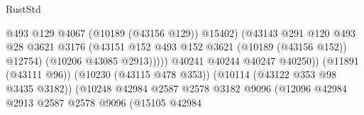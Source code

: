 \begin{lexlean}{RustStd}
\begin{coremodule}
                                                            @493
                                                            @129
                                                            @4067
                                                            (@10189 (@43156 @129))
                                                            @15402)
                                                          (@43143
                                                            @291
                                                            @120
                                                            @493
                                                            @28
                                                            @3621
                                                            @3176
                                                            (@43151
                                                              @152
                                                              @493
                                                              @152
                                                              @3621
                                                              (@10189 (@43156 @152))
                                                              @12754)
                                                            (@10206 @43085 @2913)))))
                                                    @40241
                                                    @40244
                                                    @40247
                                                    @40250))
                                                (@11891 (@43111 @96))
                                                (@10230 (@43115 @478 @353))
                                                (@10114 (@43122 @353 @98 @3435 @3182))
                                                (@10248
                                                  @42984
                                                  @2587
                                                  @2578
                                                  @3182
                                                  @9096
                                                  (@12096
                                                    @42984
                                                    @2913
                                                    @2587
                                                    @2578
                                                    @9096
                                                    (@15105
                                                      @42984

\end{coremodule}
\end{lexlean}
